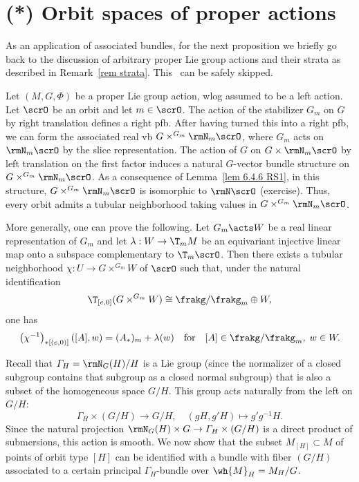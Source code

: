 \section{(*) Orbit spaces of proper actions}

As an application of associated bundles, for the next proposition we briefly go back to the discussion of arbitrary proper Lie group actions and their strata as described in Remark~\ref{rem strata}. This \sect\ can be safely skipped.

\begin{rem}[{{\cite[Rem.~6.5.8]{RS1}}}]\label{rem 6.5.8 RS1}
    Let $(M,G,\Phi)$ be a proper Lie group action, \gls{wlog} assumed to be a left action. Let $\scrO$ be an orbit and let $m\in\scrO$. The action of the stabilizer $G_m$ on $G$ by right translation defines a right \gls{pfb}. After having turned this into a right \gls{pfb}, we can form the associated real \gls{vb} $G\times^{G_m}\rmN_m\scrO$, where $G_m$ acts on $\rmN_m\scrO$ by the slice representation. The action of $G$ on $G\times\rmN_m\scrO$ by left translation on the first factor induces a natural $G$-vector bundle structure on $G\times^{G_m}\rmN_m\scrO$. As a consequence of Lemma~\ref{lem 6.4.6 RS1}, in this structure,  $G\times^{G_m}\rmN_m\scrO$ is isomorphic to $\rmN\scrO$ (exercise). Thus, every orbit admits a tubular neighborhood taking values in $G\times^{G_m}\rmN_m\scrO$.

    More generally, one can prove the following. Let $G_m\acts W$ be a real linear representation of $G_m$ and let $\lambda:W\to \T_m M$ be an equivariant injective linear map onto a subspace complementary to $\T_m\scrO$. Then there exists a tubular neighborhood $\chi:U\to G\times^{G_m}W$ of $\scrO$ such that, under the natural identification 
    \[\T_{[e,0]}(G\times^{G_m}W)\cong \frakg\slash\frakg_m\oplus W,\]
    one has 
    \[\left(\chi^{-1}\right)_{\ast[(e,0)]}\left([A],w\right)=(A_\ast)_m+\lambda(w)\quad\text{for}\quad  [A]\in\frakg\slash\frakg_m,\; w\in W.\]
\end{rem}

Recall that $\varGamma_H=\rmN_G(H)\slash H$ is a Lie group (since the normalizer of a closed subgroup contains that subgroup as a closed normal subgroup) that is also a subset of the homogeneous space $G\slash H$. This group acts naturally from the left on $G\slash H$:
\[\varGamma_H\times (G\slash H)\to G\slash H,\quad (gH,g'H)\mapsto g'g^{-1}H.\]
Since the natural projection $\rmN_G(H)\times G\to \varGamma_H\times (G\slash H)$ is a direct product of submersions, this action is smooth. We now show that the subset $M_{[H]}\subset M$ of points of orbit type $[H]$ can be identified with a bundle with fiber $(G\slash H)$ associated to a certain principal $\varGamma_H$-bundle over $\wh{M}_H=M_H\slash G$.

